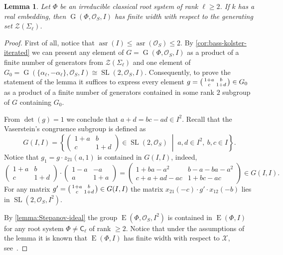 \documentclass[oneside, 12pt]{amsart}
\theoremstyle{plain}
\numberwithin{equation}{section}
\newtheorem{lemma}{Lemma}
\numberwithin{lemma}{section}
\theoremstyle{definition}
\theoremstyle{remark}
\DeclareMathOperator{\G}{G}
\DeclareMathOperator{\SL}{SL}
\DeclareMathOperator{\E}{E}
\DeclareMathOperator{\asr}{asr}
\newcommand{\rC}{\mathsf{C}}
\begin{document}
\begin{lemma}\label{lemma:width-dedekind}
Let $\Phi$ be an irreducible classical root system of rank $\ell \geqslant 2$.
If $k$ has a real embedding, then $\G(\Phi, \mathcal{O}_S, I)$ has finite width with respect to the generating set $\mathcal{Z}(\Sigma_\ell)$.
\end{lemma}
\begin{proof}
First of all, notice that $\asr(I) \leqslant \asr(\mathcal{O}_S) \leqslant 2$. 
By \cref{cor:bass-kolster-iterated} we can present any element 
of $G=\G(\Phi, \mathcal{O}_S, I)$ as a product of a finite number of generators from $\mathcal{Z}(\Sigma_\ell)$ and one element of 
$G_0 = \G(\{\alpha_\ell, -\alpha_\ell\}, \mathcal{O}_S, I)\cong\SL(2, \mathcal{O}_S, I)$.
Consequently, to prove the statement of the lemma it suffices to express every element 
$g = \begin{psmallmatrix}1+a & b \\ c & 1+d \end{psmallmatrix} \in G_0$
as a product of a finite number of generators contained in some rank $2$ subgroup of $G$ containing $G_0$.

From $\det(g)=1$ we conclude that $a+d=bc-ad\in I^2$. 
Recall that the Vaserstein's congruence subgroup is defined as
\[ G(I, I)=\left\{ \begin{pmatrix}1+a & b \\ c & 1+d\end{pmatrix}\in\SL(2, \mathcal{O}_S)\;\middle|\; a, d\in I^2, \ b, c\in I \right\}. \]
Notice that $g_1=g\cdot z_{21}(a, 1)$ is contained in $G(I, I)$, indeed,
\[ \begin{pmatrix} 1+a & b \\ c & 1+d \end{pmatrix} \cdot \begin{pmatrix} 1-a & -a \\ a & 1+a \end{pmatrix} = \begin{pmatrix} 1+ba-a^2 & b-a-ba-a^2 \\ c+a+ad-ac & 1+bc-ac \end{pmatrix} \in G(I, I). \]
For any matrix $g'=\begin{psmallmatrix}1+a & b \\ c & 1+d\end{psmallmatrix}\in G(I, I)$ the matrix $x_{21}(-c)\cdot g'\cdot x_{12}(-b)$ lies in $\SL\left(2, \mathcal{O}_S, I^2\right)$.

By \cref{lemma:Stepanov-ideal} the group $\E\left(\Phi, \mathcal{O}_S, I^2\right)$ is contained in $\E(\Phi, I)$ for any root system $\Phi\neq\rC_\ell$ of rank $\geqslant2$.
Notice that under the assumptions of the lemma it is known that $\E(\Phi, I)$ has finite width with respect to $\mathcal{X}$, see~\cite[Theorem~3.3]{TavgenThesis}.


\end{proof}
\end{document}

